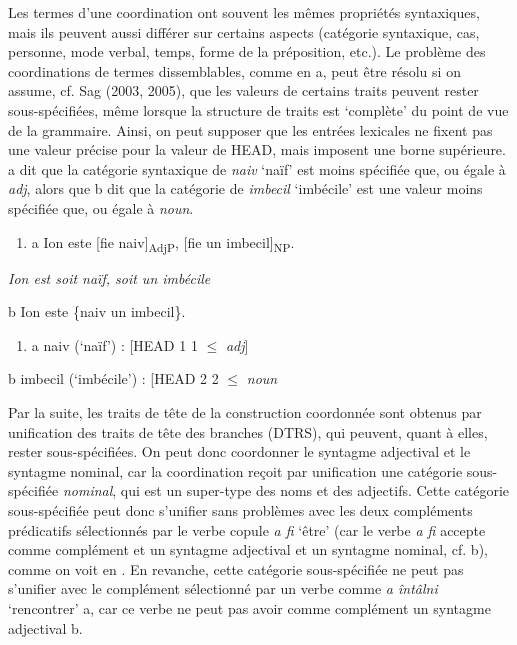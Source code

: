 Les termes d'une coordination ont souvent les mêmes propriétés syntaxiques, mais ils peuvent aussi différer sur certains aspects (catégorie syntaxique, cas, personne, mode verbal, temps, forme de la préposition, etc.). Le problème des coordinations de termes dissemblables, comme en a, peut être résolu si on assume, cf. Sag (2003, 2005), que les valeurs de certains traits peuvent rester sous-spécifiées, même lorsque la structure de traits est `complète' du point de vue de la grammaire. Ainsi, on peut supposer que les entrées lexicales ne fixent pas une valeur précise pour la valeur de HEAD, mais imposent une borne supérieure. a dit que la catégorie syntaxique de \textit{naiv} `naïf' est moins spécifiée que, ou égale à \textit{adj}, alors que b dit que la catégorie de \textit{imbecil} `imbécile' est une valeur moins spécifiée que, ou égale à \textit{noun}. 


\begin{enumerate}
\item \label{bkm:Ref290403129}a  Ion este [fie naiv]\textsubscript{AdjP}, [fie un imbecil]\textsubscript{NP}.


\end{enumerate}
{\itshape
Ion est soit naïf, soit un imbécile}

  b  Ion este \{naiv {\textbar} un imbecil\}.  


\begin{enumerate}
\item \label{bkm:Ref299914157}a  naiv (`naïf') : [HEAD 1 {\textbar} 1 ${\leq}$ \textit{adj}]


\end{enumerate}
  b  imbecil (`imbécile') : [HEAD 2 {\textbar} 2 ${\leq}$ \textit{noun}

Par la suite, les traits de tête de la construction coordonnée sont obtenus par unification des traits de tête des branches (DTRS), qui peuvent, quant à elles, rester sous-spécifiées. On peut donc coordonner le syntagme adjectival et le syntagme nominal, car la coordination reçoit par unification une catégorie sous-spécifiée \textit{nominal}, qui est un super-type des noms et des adjectifs. Cette catégorie sous-spécifiée peut donc s'unifier sans problèmes avec les deux compléments prédicatifs sélectionnés par le verbe copule \textit{a fi} `être' (car le verbe \textit{a fi} accepte comme complément et un syntagme adjectival et un syntagme nominal, cf. b), comme on voit en . En revanche, cette catégorie sous-spécifiée ne peut pas s'unifier avec le complément sélectionné par un verbe comme \textit{a întâlni} `rencontrer' a, car ce verbe ne peut pas avoir comme complément un syntagme adjectival b.  


